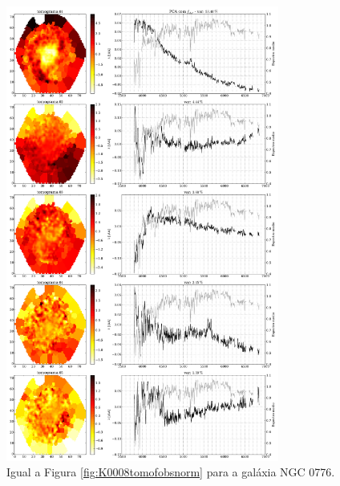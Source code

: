 \begin{figure}
    \includegraphics[width=0.8\textwidth]{figuras/K0073-tomo-obs-norm.pdf}
    \caption[Tomogramas de 1 a 5 para o cubo $f_{obs}$ - NGC 0776.]
    {Igual a Figura \ref{fig:K0008tomofobsnorm} para a galáxia NGC 0776.}
    \label{fig:K0073tomofobsnorm}
\end{figure}

